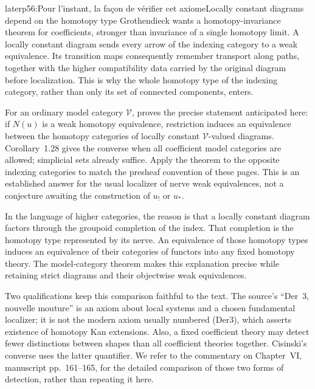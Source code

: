 \begin{dcomment}{later}{p56:Pour l'instant, la façon de vérifier cet axiome}{Locally constant diagrams depend on the homotopy type}
Grothendieck wants a homotopy-invariance theorem for coefficients, stronger than invariance of a single homotopy limit. A locally constant diagram sends every arrow of the indexing category to a weak equivalence. Its transition maps consequently remember transport along paths, together with the higher compatibility data carried by the original diagram before localization. This is why the whole homotopy type of the indexing category, rather than only its set of connected components, enters.

For an ordinary model category $\mathcal V$, \citet[Theorem~1.3]{Cisinski2009LocallyConstant} proves the precise statement anticipated here: if $N(u)$ is a weak homotopy equivalence, restriction induces an equivalence between the homotopy categories of locally constant $\mathcal V$-valued diagrams. Corollary~1.28 gives the converse when all coefficient model categories are allowed; simplicial sets already suffice. Apply the theorem to the opposite indexing categories to match the presheaf convention of these pages. This is an established answer for the usual localizer of nerve weak equivalences, not a conjecture awaiting the construction of $u_!$ or $u_*$.

In the language of higher categories, the reason is that a locally constant diagram factors through the groupoid completion of the index. That completion is the homotopy type represented by its nerve. An equivalence of those homotopy types induces an equivalence of their categories of functors into any fixed homotopy theory. The model-category theorem makes this explanation precise while retaining strict diagrams and their objectwise weak equivalences.

Two qualifications keep this comparison faithful to the text. The source's ``Der~3, nouvelle mouture'' is an axiom about local systems and a chosen fundamental localizer; it is not the modern axiom usually numbered (Der3), which asserts existence of homotopy Kan extensions. Also, a fixed coefficient theory may detect fewer distinctions between shapes than all coefficient theories together. Cisinski's converse uses the latter quantifier. We refer to the commentary on Chapter~VI, manuscript pp.~161--165, for the detailed comparison of those two forms of detection, rather than repeating it here.
\end{dcomment}


